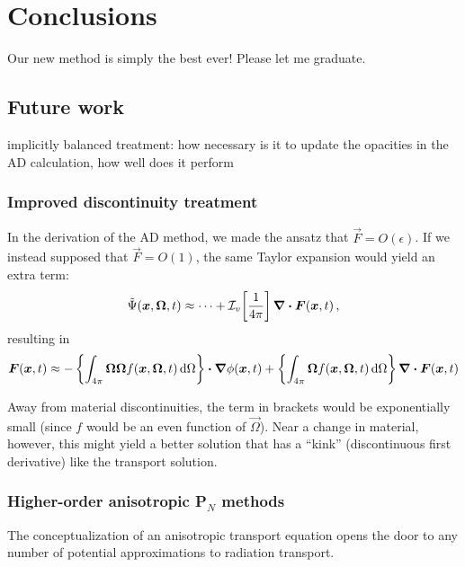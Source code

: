 
\chapter{Conclusions}\label{chap:conclusion}

Our new method is simply the best ever! Please let me graduate.

\section{Future work}

implicitly balanced treatment: how necessary is it to update the opacities in
the AD calculation, how well does it perform

\subsection{Improved discontinuity treatment}
In the derivation of the AD method, we made the ansatz that
$\vec{F}=O(\epsilon)$. If we instead supposed that $\vec{F}=O(1)$, the same
Taylor expansion would yield an extra term:
\begin{equation*}
  \tilde\Psi(\bm{x}, \bm{\Omega}, t)
  \approx \cdots + \mathcal{I}_{v}\!\left[ \frac1{4\pi} \right] \bm{\nabla} \bm{\cdot} \bm{F}(\bm{x},t)\,,
\end{equation*}
resulting in
\begin{equation*}
  \bm{F}(\bm{x}, t)
  \approx - \left\{ \int_{4\pi} \bm{\Omega} \bm{\Omega} f(\bm{x},\bm{\Omega},t) \mathop{}\!\mathrm{d}\Omega
  \right\} \bm{\cdot} \bm{\nabla} \phi(\bm{x},t)
  + \left\{ \int_{4\pi} \bm{\Omega} f(\bm{x},\bm{\Omega},t) \mathop{}\!\mathrm{d}\Omega
  \right\} \bm{\nabla} \bm{\cdot} \bm{F}(\bm{x},t)
\end{equation*}

Away from material discontinuities, the term in brackets would be
exponentially small (since $f$ would be an even function of $\vec{\Omega}$).
Near a change in material, however, this might yield a better solution that has
a ``kink'' (discontinuous first derivative) like the transport solution.

\subsection{Higher-order anisotropic P$_N$ methods}
The conceptualization of an anisotropic transport equation opens the door to
any number of potential approximations to radiation transport.


